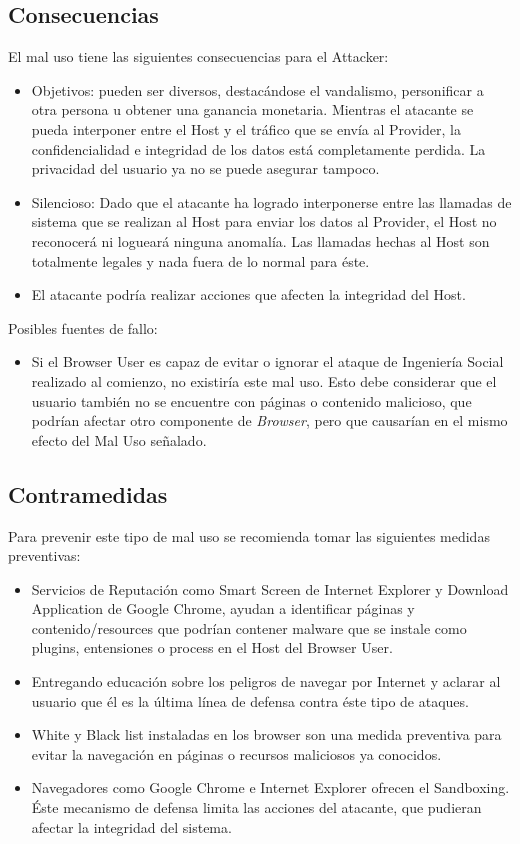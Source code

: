 \subsection{Consecuencias}
	El mal uso tiene las siguientes consecuencias para el Attacker:
	\begin{itemize}
		\item Objetivos: pueden ser diversos, destacándose el vandalismo, personificar a otra persona u obtener una ganancia monetaria. Mientras el atacante se pueda interponer entre el Host y el tráfico que se envía al Provider, la confidencialidad e integridad de los datos está completamente perdida. La privacidad del usuario ya no se puede asegurar tampoco.
		\item Silencioso: Dado que el atacante ha logrado interponerse entre las llamadas de sistema que se realizan al Host para enviar los datos al Provider, el Host no reconocerá ni logueará ninguna anomalía. Las llamadas hechas al Host son totalmente legales y nada fuera de lo normal para éste.
		\item El atacante podría realizar acciones que afecten la integridad del Host.
	\end{itemize}
	Posibles fuentes de fallo:
	\begin{itemize}
		\item Si el Browser User es capaz de evitar o ignorar el ataque de Ingeniería Social realizado al comienzo, no existiría este mal uso. Esto debe considerar que el usuario también no se encuentre con páginas o contenido malicioso, que podrían afectar otro componente de \textit{Browser}, pero que causarían en el mismo efecto del Mal Uso señalado.
	\end{itemize}

\subsection{Contramedidas} 
	Para prevenir este tipo de mal uso se recomienda tomar las siguientes medidas preventivas:
	\begin{itemize}
		\item Servicios de Reputación como Smart Screen de Internet Explorer y Download Application de Google Chrome, ayudan a identificar páginas y contenido/resources que podrían contener malware que se instale como plugins, entensiones o process en el Host del Browser User.
		\item Entregando educación sobre los peligros de navegar por Internet y aclarar al usuario que él es la última línea de defensa contra éste tipo de ataques.
		\item White y Black list instaladas en los browser son una medida preventiva para evitar la navegación en páginas o recursos maliciosos ya conocidos.
		\item Navegadores como Google Chrome e Internet Explorer ofrecen el Sandboxing. Éste mecanismo de defensa limita las acciones del atacante, que pudieran afectar la integridad del sistema.
	\end{itemize}

